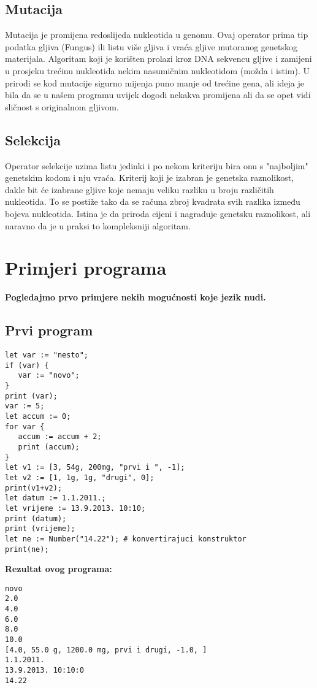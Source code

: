 \documentclass[12pt]{scrartcl}
\begin{document}
\subsection{Mutacija}
Mutacija je promijena redoslijeda nukleotida u genomu. Ovaj operator prima tip podatka gljiva (Fungus) ili
listu više gljiva i vraća gljive mutoranog genetskog materijala. Algoritam koji je korišten prolazi kroz
DNA sekvencu gljive i zamijeni u prosjeku trećinu nukleotida nekim nasumičnim nukleotidom (možda i istim).
U prirodi se kod mutacije sigurno mijenja puno manje od trećine gena, ali ideja je bila da se u našem
programu uvijek dogodi nekakva promijena ali da se opet vidi sličnost s originalnom gljivom.
\subsection{Selekcija}
Operator selekcije uzima listu jedinki i po nekom kriteriju bira onu s "najboljim" genetskim kodom i nju
vraća. Kriterij koji je izabran je genetska raznolikost, dakle bit će izabrane gljive koje nemaju
veliku razliku u broju različitih nukleotida. To se postiže tako da se računa zbroj kvadrata svih razlika
između bojeva nukleotida. Istina je da priroda cijeni i nagraduje genetsku raznolikost, ali naravno da je
u praksi to kompleksniji algoritam.

\section{Primjeri programa}
\textbf{Pogledajmo prvo primjere nekih mogućnosti koje jezik nudi.}
\subsection{Prvi program}
\begin{lstlisting}
let var := "nesto";
if (var) {
   var := "novo";
}
print (var);
var := 5;
let accum := 0;
for var {
   accum := accum + 2;
   print (accum);
}
let v1 := [3, 54g, 200mg, "prvi i ", -1];
let v2 := [1, 1g, 1g, "drugi", 0];
print(v1+v2);
let datum := 1.1.2011.;
let vrijeme := 13.9.2013. 10:10;
print (datum);
print (vrijeme);
let ne := Number("14.22"); # konvertirajuci konstruktor
print(ne);
\end{lstlisting}
\textbf{Rezultat ovog programa:}
\begin{lstlisting}
novo
2.0
4.0
6.0
8.0
10.0
[4.0, 55.0 g, 1200.0 mg, prvi i drugi, -1.0, ]
1.1.2011.
13.9.2013. 10:10:0
14.22
\end{lstlisting}
\end{document}
